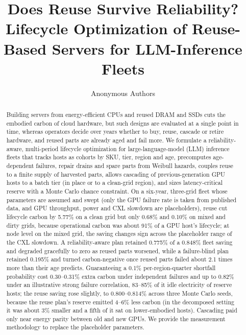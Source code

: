\documentclass[11pt]{article}
\title{Does Reuse Survive Reliability? Lifecycle Optimization of Reuse-Based Servers for LLM-Inference Fleets}
\author{Anonymous Authors}
\date{}
\begin{document}
\maketitle

\begin{abstract}
Building servers from energy-efficient CPUs and reused DRAM and SSDs cuts the embodied carbon of cloud hardware, but such designs are evaluated at a single point in time, whereas operators decide over years whether to buy, reuse, cascade or retire hardware, and reused parts are already aged and fail more. We formulate a reliability-aware, multi-period lifecycle optimization for large-language-model (LLM) inference fleets that tracks hosts as cohorts by SKU, tier, region and age, precomputes age-dependent failures, repair drains and spare parts from Weibull hazards, couples reuse to a finite supply of harvested parts, allows cascading of previous-generation GPU hosts to a batch tier (in place or to a clean-grid region), and sizes latency-critical reserve with a Monte Carlo chance constraint. On a six-year, three-grid fleet whose parameters are assumed and swept (only the GPU failure rate is taken from published data, and GPU throughput, power and CXL slowdown are placeholders), reuse cut lifecycle carbon by 5.77\% on a clean grid but only 0.68\% and 0.10\% on mixed and dirty grids, because operational carbon was about 91\% of a GPU host's lifecycle; at node level on the mixed grid, the saving changes sign across the placeholder range of the CXL slowdown. A reliability-aware plan retained 0.775\% of a 0.848\% fleet saving and degraded gracefully to zero as reused parts worsened, while a failure-blind plan retained 0.195\% and turned carbon-negative once reused parts failed about 2.1 times more than their age predicts. Guaranteeing a 0.1\% per-region-quarter shortfall probability cost 0.30--0.31\% extra carbon under independent failures and up to 0.82\% under an illustrative strong failure correlation, 83--85\% of it idle electricity of reserve hosts; the reuse saving rose slightly, to 0.800--0.814\% across three Monte Carlo seeds, because the reuse plan's reserve emitted 4--6\% less carbon (in the decomposed setting it was about 3\% smaller and a fifth of it sat on lower-embodied hosts). Cascading paid only near energy parity between old and new GPUs. We provide the measurement methodology to replace the placeholder parameters.
\end{abstract}
\end{document}
